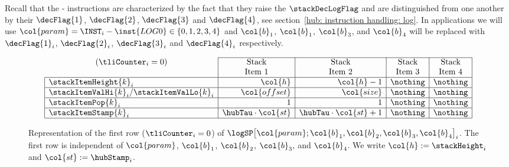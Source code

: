 Recall that the - instructions are characterized by the fact that they raise the $\stackDecLogFlag$ and are distinguished from one another by their
$\decFlag{1}$, $\decFlag{2}$, $\decFlag{3}$ and $\decFlag{4}$, see section~\ref{hub: instruction handling: log}.
In applications we will use $\col{param} = \INST_{i} - \inst{LOG0} \in \{ 0, 1, 2, 3, 4 \}$ and
$\col{b}_{1}$,     $\col{b}_{1}$,     $\col{b}_{3}$,    and $\col{b}_{4}$     will be replaced with
$\decFlag{1}_{i}$, $\decFlag{2}_{i}$, $\decFlag{3}_{i}$ and $\decFlag{4}_{i}$ respectively.




\begin{figure}[h!]
\[
	\begin{array}{|l|r|r|c|c|}
	\cline{2-5}
	\multicolumn{1}{c|}{(\tliCounter_{i} = 0)}      & \multicolumn{1}{c|}{\text{Stack}}  & \multicolumn{1}{c|}{\text{Stack}}  & \multicolumn{1}{c|}{\text{Stack}}  & \multicolumn{1}{c|}{\text{Stack}}  \\
	\multicolumn{1}{c|}{}                           & \multicolumn{1}{c|}{\text{Item 1}} & \multicolumn{1}{c|}{\text{Item 2}} & \multicolumn{1}{c|}{\text{Item 3}} & \multicolumn{1}{c|}{\text{Item 4}} \\ \hline
	\stackItemHeight{k}_{i}                         & \col{h}                            & \col{h} - 1                        & \nothing                           & \nothing                           \\ \hline 
	\stackItemValHi{k}_{i} / \stackItemValLo{k}_{i} & \col{offset}                       & \col{size}                         & \nothing                           & \nothing                           \\ \hline
	\stackItemPop{k}_{i}                            & 1                                  & 1                                  & \nothing                           & \nothing                           \\ \hline
	\stackItemStamp{k}_{i}                          & \hubTau \cdot \col{st}             & \hubTau \cdot \col{st} + 1         & \nothing                           & \nothing                           \\ \hline
	\end{array}	
\]
\caption{%
Representation of the first row ($\tliCounter_{i} = 0$) of $\logSP\big[\col{param}; \col{b}_{1}, \col{b}_{2}, \col{b}_{3}, \col{b}_{4} \big]_{i}$.
The first row is independent of $\col{param}$, $\col{b}_{1}$, $\col{b}_{2}$, $\col{b}_{3},$ and $ \col{b}_{4}$.
We write $\col{h} := \stackHeight_{i}$ and $\col{st} := \hubStamp_{i}$.}
\end{figure}
